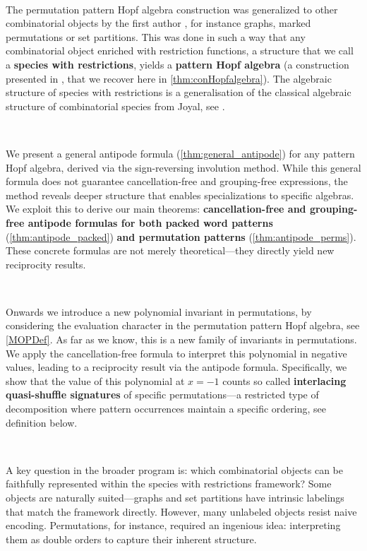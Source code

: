 \documentclass[12pt, reqno]{amsart}
\theoremstyle{definition}
\begin{document}
\

The permutation pattern Hopf algebra construction was generalized to other combinatorial objects by the first author \cite{Penaguiao2020}, for instance graphs, marked permutations or set partitions.
This was done in such a way that any combinatorial object enriched with restriction functions, a structure that we call a \textbf{species with restrictions}, yields a \textbf{pattern Hopf algebra} (a construction presented in \cite{Penaguiao2020}, that we recover here in \cref{thm:conHopfalgebra}).
The algebraic structure of species with restrictions is a generalisation of the classical algebraic structure of combinatorial species from Joyal, see \cite{AM2010}.


\

We present a general antipode formula (\cref{thm:general_antipode}) for any pattern Hopf algebra, derived via the sign-reversing involution method.
While this general formula does not guarantee cancellation-free and grouping-free expressions, the method reveals deeper structure that enables specializations to specific algebras.
We exploit this to derive our main theorems: \textbf{cancellation-free and grouping-free antipode formulas for both packed word patterns} (\cref{thm:antipode_packed}) \textbf{and permutation patterns} (\cref{thm:antipode_perms}).
These concrete formulas are not merely theoretical---they directly yield new reciprocity results.

\

Onwards we introduce a new polynomial invariant in permutations, by considering the evaluation character in the permutation pattern Hopf algebra, see \cref{MOPDef}.
As far as we know, this is a new family of invariants in permutations.
We apply the cancellation-free formula to interpret this polynomial in negative values, leading to a reciprocity result via the antipode formula.
Specifically, we show that the value of this polynomial at $x = -1$ counts so called \textbf{interlacing quasi-shuffle signatures} of specific permutations---a restricted type of decomposition where pattern occurrences maintain a specific ordering, see definition below.

\

A key question in the broader program is: which combinatorial objects can be faithfully represented within the species with restrictions framework?
Some objects are naturally suited---graphs and set partitions have intrinsic labelings that match the framework directly.
However, many unlabeled objects resist naive encoding.
Permutations, for instance, required an ingenious idea: interpreting them as double orders to capture their inherent structure.
\end{document}
